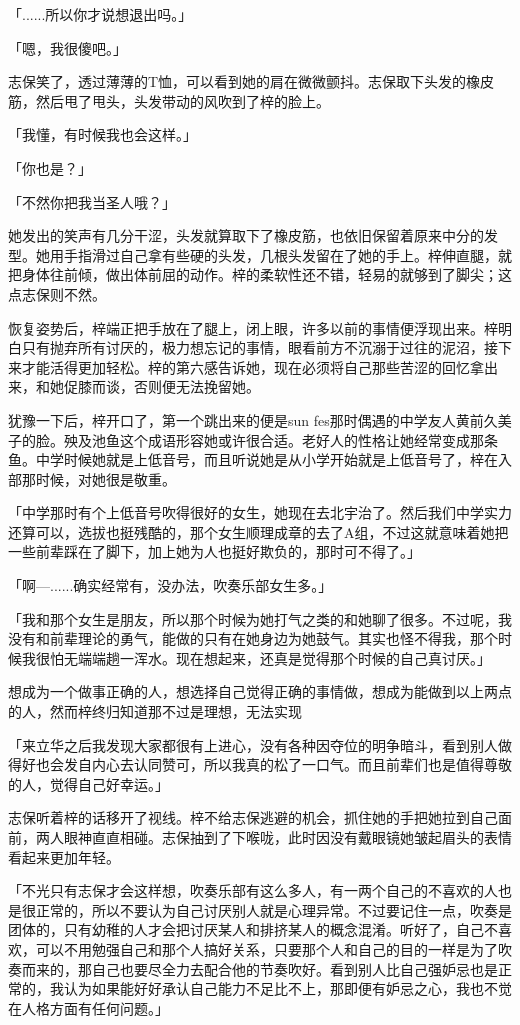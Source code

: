 \documentclass[UTF8]{ctexart}
\begin{document}
    「......所以你才说想退出吗。」

    「嗯，我很傻吧。」

    志保笑了，透过薄薄的T恤，可以看到她的肩在微微颤抖。志保取下头发的橡皮筋，然后甩了甩头，头发带动的风吹到了梓的脸上。

    「我懂，有时候我也会这样。」

    「你也是？」

    「不然你把我当圣人哦？」

    她发出的笑声有几分干涩，头发就算取下了橡皮筋，也依旧保留着原来中分的发型。她用手指滑过自己拿有些硬的头发，几根头发留在了她的手上。梓伸直腿，就把身体往前倾，做出体前屈的动作。梓的柔软性还不错，轻易的就够到了脚尖；这点志保则不然。

    恢复姿势后，梓端正把手放在了腿上，闭上眼，许多以前的事情便浮现出来。梓明白只有抛弃所有讨厌的，极力想忘记的事情，眼看前方不沉溺于过往的泥沼，接下来才能活得更加轻松。梓的第六感告诉她，现在必须将自己那些苦涩的回忆拿出来，和她促膝而谈，否则便无法挽留她。

    犹豫一下后，梓开口了，第一个跳出来的便是sun fes那时偶遇的中学友人黄前久美子的脸。殃及池鱼这个成语形容她或许很合适。老好人的性格让她经常变成那条鱼。中学时候她就是上低音号，而且听说她是从小学开始就是上低音号了，梓在入部那时候，对她很是敬重。

    「中学那时有个上低音号吹得很好的女生，她现在去北宇治了。然后我们中学实力还算可以，选拔也挺残酷的，那个女生顺理成章的去了A组，不过这就意味着她把一些前辈踩在了脚下，加上她为人也挺好欺负的，那时可不得了。」

    「啊—......确实经常有，没办法，吹奏乐部女生多。」

    「我和那个女生是朋友，所以那个时候为她打气之类的和她聊了很多。不过呢，我没有和前辈理论的勇气，能做的只有在她身边为她鼓气。其实也怪不得我，那个时候我很怕无端端趟一浑水。现在想起来，还真是觉得那个时候的自己真讨厌。」

    想成为一个做事正确的人，想选择自己觉得正确的事情做，想成为能做到以上两点的人，然而梓终归知道那不过是理想，无法实现

    「来立华之后我发现大家都很有上进心，没有各种因夺位的明争暗斗，看到别人做得好也会发自内心去认同赞可，所以我真的松了一口气。而且前辈们也是值得尊敬的人，觉得自己好幸运。」

    志保听着梓的话移开了视线。梓不给志保逃避的机会，抓住她的手把她拉到自己面前，两人眼神直直相碰。志保抽到了下喉咙，此时因没有戴眼镜她皱起眉头的表情看起来更加年轻。

    「不光只有志保才会这样想，吹奏乐部有这么多人，有一两个自己的不喜欢的人也是很正常的，所以不要认为自己讨厌别人就是心理异常。不过要记住一点，吹奏是团体的，只有幼稚的人才会把讨厌某人和排挤某人的概念混淆。听好了，自己不喜欢，可以不用勉强自己和那个人搞好关系，只要那个人和自己的目的一样是为了吹奏而来的，那自己也要尽全力去配合他的节奏吹好。看到别人比自己强妒忌也是正常的，我认为如果能好好承认自己能力不足比不上，那即便有妒忌之心，我也不觉在人格方面有任何问题。」
\end{document}
